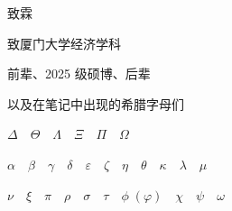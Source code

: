 \begin{titlepage}
  \centering
  \vspace*{5cm}

{\LARGE\kaiti
\strut 致\hspace{1em}霖\\[32pt]
\strut 致\hspace{1em}厦门大学经济学科\\
\strut 前辈、{\Large{2025}} 级硕博、后辈\\[32pt]
\strut 以及在笔记中出现的希腊字母们\\
\strut {\Large$\Delta\quad\Theta\quad\Lambda\quad\Xi\quad\Pi\quad\Omega$}\\
\strut {\Large$\alpha\quad\beta\quad\gamma\quad\delta\quad\varepsilon\quad\zeta\quad\eta\quad\theta\quad\kappa\quad\lambda\quad\mu$}\\
\strut {\Large$\nu\quad\xi\quad\pi\quad\rho\quad\sigma\quad\tau\quad\phi\;(\varphi)\quad\chi\quad\psi\quad\omega$}}

\end{titlepage}
